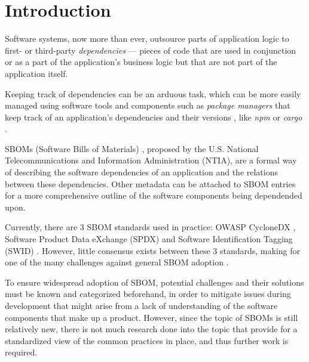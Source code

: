 \section{Introduction}

Software systems, now more than ever, outsource parts of application logic to first- or third-party \emph{dependencies} --- pieces of code that are used in conjunction or as a part of the application's business logic but that are not part of the application itself.

Keeping track of dependencies can be an arduous task, which can be more easily managed using software tools and components such as \emph{package managers} that keep track of an application's dependencies and their versions \cite{article:package-manager}, like \emph{npm} or \emph{cargo} \cite{tools:pkg-mngr:npm,tools:pkg-mngr:cargo}.

SBOMs (Software Bills of Materials) \cite{article:concept:sbom-2}, proposed by the U.S. National Telecommunications and Information Administration (NTIA), are a formal way of describing the software dependencies of an application and the relations between these dependencies. Other metadata can be attached to SBOM entries for a more comprehensive outline of the software components being dependended upon.

Currently, there are 3 SBOM standards used in practice: OWASP CycloneDX \cite{standards:sbom:cyclonedx}, Software Product Data eXchange (SPDX) \cite{standards:sbom:spdx} and Software Identification Tagging (SWID) \cite{standards:sbom:swid}. However, little consensus exists between these 3 standards, making for one of the many challenges against general SBOM adoption \cite{article:sbom-study}.

To ensure widespread adoption of SBOM, potential challenges and their solutions must be known and categorized beforehand, in order to mitigate issues during development that might arise from a lack of understanding of the software components that make up a product. However, since the topic of SBOMs is still relatively new, there is not much research done into the topic that provide for a standardized view of the common practices in place, and thus further work is required.

